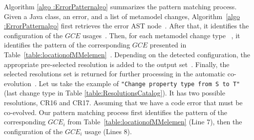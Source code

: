 Algorithm \ref{algo :ErrorPatternalgo} summarizes the pattern matching process. 
Given a Java class, an error, and a list of metamodel changes, Algorithm~\ref{algo :ErrorPatternalgo} first retrieves the error AST node~{\small{}}. After that, it identifies the configuration of the $GCE$ usages~{\small{}}. Then, for each metamodel change type ~{\small{}}, it identifies the pattern of the corresponding $GCE$ presented in Table~\ref{table:locationofMMelemen}~{\small{}}. %
Depending on the detected configuration, the appropriate pre-selected resolution is added to the output set~{\small{}}.
Finally, the selected resolutions set is returned for further processing in the automatic co-evolution~{\small{}}. 
Let us take the example of \texttt{"Change property type from S to T"} (last change type in Table \ref{table:ResolutionsCatalog}). It has two possible resolutions, CR16 and CR17. Assuming that we have a code error that must be co-evolved. Our pattern matching process first identifies the pattern of the corresponding $GCE_i$ from Table~\ref{table:locationofMMelemen} (Line 7), then the configuration of the $GCE_i$ usage (Lines 8). 

